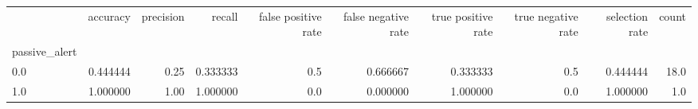 \begin{tabular}{lrrrrrrrrr}
\toprule
{} &  accuracy &  precision &    recall &  false positive rate &  false negative rate &  true positive rate &  true negative rate &  selection rate &  count \\
passive\_alert &           &            &           &                      &                      &                     &                     &                 &        \\
\midrule
0.0           &  0.444444 &       0.25 &  0.333333 &                  0.5 &             0.666667 &            0.333333 &                 0.5 &        0.444444 &   18.0 \\
1.0           &  1.000000 &       1.00 &  1.000000 &                  0.0 &             0.000000 &            1.000000 &                 0.0 &        1.000000 &    1.0 \\
\bottomrule
\end{tabular}
